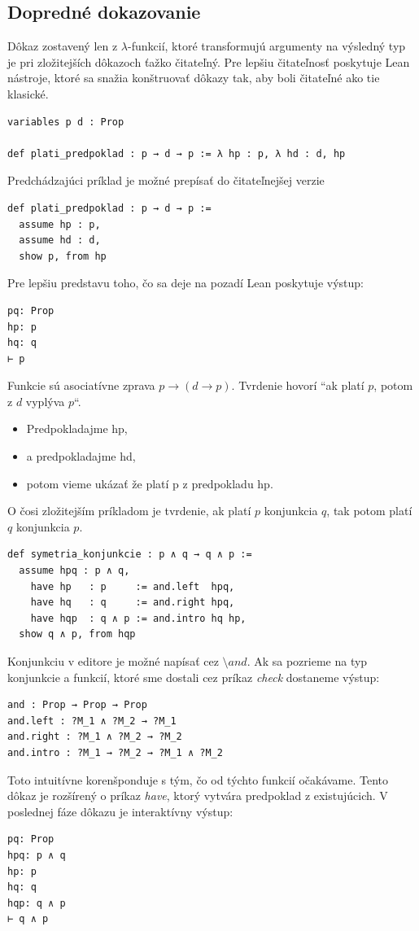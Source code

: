 \documentclass[a4paper,10pt,oneside]{report}%
\begin{document}
\subsection{Dopredné dokazovanie}
    Dôkaz zostavený len z $\lambda$-funkcií, ktoré transformujú argumenty
na výsledný typ je pri zložitejších dôkazoch ťažko čitateľný.
    Pre lepšiu čitateľnosť poskytuje Lean nástroje, ktoré sa snažia konštruovať dôkazy tak,
aby boli čitateľné ako tie klasické.
\begin{lstlisting}
variables p d : Prop

def plati_predpoklad : p → d → p := λ hp : p, λ hd : d, hp
\end{lstlisting}
    Predchádzajúci príklad je možné prepísať do čitateľnejšej verzie
\begin{lstlisting}
def plati_predpoklad : p → d → p :=
  assume hp : p,
  assume hd : d,
  show p, from hp
\end{lstlisting}
Pre lepšiu predstavu toho, čo sa deje na pozadí Lean poskytuje výstup:
\begin{lstlisting}
pq: Prop
hp: p
hq: q
⊢ p
\end{lstlisting}
    Funkcie sú asociatívne zprava $p \to ( d \to p )$.
    Tvrdenie hovorí ``ak platí $p$, potom z $d$ vyplýva $p$``.
\begin{itemize}
    \item Predpokladajme hp,
    \item a predpokladajme hd,
    \item potom vieme ukázať že platí p z predpokladu hp.
\end{itemize}
    O čosi zložitejším príkladom je tvrdenie, ak platí $p$ konjunkcia $q$, tak potom
platí $q$ konjunkcia $p$.
\begin{lstlisting}
def symetria_konjunkcie : p ∧ q → q ∧ p :=
  assume hpq : p ∧ q,
    have hp   : p     := and.left  hpq,
    have hq   : q     := and.right hpq,
    have hqp  : q ∧ p := and.intro hq hp,
  show q ∧ p, from hqp
\end{lstlisting}
    Konjunkciu v editore je možné napísať cez $\texttt{\textbackslash}and$.
    Ak sa pozrieme na typ konjunkcie a funkcií, ktoré sme dostali cez príkaz \emph{check}
dostaneme výstup:
\begin{lstlisting}
and : Prop → Prop → Prop
and.left : ?M_1 ∧ ?M_2 → ?M_1
and.right : ?M_1 ∧ ?M_2 → ?M_2
and.intro : ?M_1 → ?M_2 → ?M_1 ∧ ?M_2
\end{lstlisting}
    Toto intuitívne korenšponduje s tým, čo od týchto funkcií očakávame.
    Tento dôkaz je rozšírený o príkaz \emph{have}, ktorý vytvára predpoklad z existujúcich.
    V poslednej fáze dôkazu je interaktívny výstup:
\begin{lstlisting}
pq: Prop
hpq: p ∧ q
hp: p
hq: q
hqp: q ∧ p
⊢ q ∧ p
\end{lstlisting}
\end{document}
